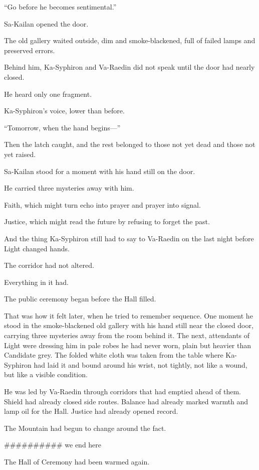 “Go before he becomes sentimental.”\par
Sa-Kailan opened the door.\par
The old gallery waited outside, dim and smoke-blackened, full of failed lamps and preserved errors.\par
Behind him, Ka-Syphiron and Va-Raedin did not speak until the door had nearly closed.\par
He heard only one fragment.\par
Ka-Syphiron’s voice, lower than before.\par
“Tomorrow, when the hand begins—”\par
Then the latch caught, and the rest belonged to those not yet dead and those not yet raised.\par
Sa-Kailan stood for a moment with his hand still on the door.\par
He carried three mysteries away with him.\par
Faith, which might turn echo into prayer and prayer into signal.\par
Justice, which might read the future by refusing to forget the past.\par
And the thing Ka-Syphiron still had to say to Va-Raedin on the last night before Light changed hands.\par
The corridor had not altered.\par
Everything in it had.\par
The public ceremony began before the Hall filled.\par
That was how it felt later, when he tried to remember sequence. One moment he stood in the smoke-blackened old gallery with his hand still near the closed door, carrying three mysteries away from the room behind it. The next, attendants of Light were dressing him in pale robes he had never worn, plain but heavier than Candidate grey. The folded white cloth was taken from the table where Ka-Syphiron had laid it and bound around his wrist, not tightly, not like a wound, but like a visible condition.\par
He was led by Va-Raedin through corridors that had emptied ahead of them. Shield had already closed side routes. Balance had already marked warmth and lamp oil for the Hall. Justice had already opened record.\par
The Mountain had begun to change around the fact.\par

########## we end here

The Hall of Ceremony had been warmed again.\par

